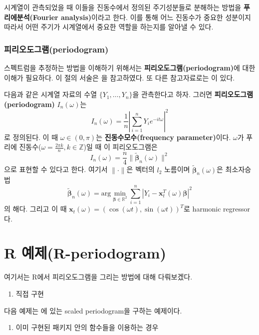 \documentclass[b5paper,]{scrbook}
\providecommand{\tightlist}{%
  \setlength{\itemsep}{0pt}\setlength{\parskip}{0pt}}
\theoremstyle{plain}
\theoremstyle{definition}
\numberwithin{equation}{section}
\begin{document}
시계열이 관측되었을 때 이들을 진동수에서 정의된 주기성분들로 분해하는 방법을 \textbf{푸리에분석(Fourier analysis)}이라고 한다. 이를 통해 어느 진동수가 중요한 성분이지 따라서 어떤 주기가 시계열에서 중요한 역할을 하는지를 알아낼 수 있다.

\hypertarget{periodogram}{%
\subsubsection{피리오도그램(periodogram)}\label{periodogram}}

스펙트럼을 추정하는 방법을 이해하기 위해서는 \textbf{피리오도그램(periodogram)}에 대한 이해가 필요하다. 이 절의 서술은 \citep{Lim2013}을 참고하였다. 또 다른 참고자료로는 \citep{Shumway2010}이 있다.

다음과 같은 시계열 자료의 수열 \(\{Y_{1}, \ldots, Y_{n}\}\)을 관측한다고 하자. 그러면 \textbf{피리오도그램(periodogram)} \(I_{n}(\omega)\)는
\[I_{n}(\omega)=\frac{1}{n}| \sum_{i=1}^{n}Y_{i}e^{-it\omega}|^{2}\]
로 정의된다. 이 때 \(\omega\in (0,\pi)\)는 \textbf{진동수모수(frequency parameter)}이다. \(\omega\)가 푸리에 진동수(\(\omega=\frac{2\pi k}{n}, k\in\mathbb{Z}\))일 때 이 피리오도그램은
\[I_{n}(\omega)=\frac{n}{4}\| \tilde{\boldsymbol{\beta}}_{n}(\omega)\|^{2}\]
으로 표현할 수 있다고 한다\citep{Li2008}. 여기서 \(\| \cdot \|\)은 벡터의 \(l_{2}\) 노름이며 \(\tilde{\boldsymbol{\beta}}_{n}(\omega)\)은 최소자승법
\[\tilde{\boldsymbol{\beta}}_{n}(\omega)=\text{arg}\min_{\boldsymbol{\beta}\in\mathbb{R}^{2}}\sum_{i=1}^{n}| Y_{i}-\mathbf{x}_{t}^{T}(\omega)\boldsymbol{\beta}|^{2}\]
의 해다. 그리고 이 때 \(\mathbf{x}_{t}(\omega)=(\cos(\omega t), \sin (\omega t))^{T}\)로 harmonic regressor다.

\hypertarget{r-r-periodogram}{%
\section{R 예제(R-periodogram)}\label{r-r-periodogram}}

여기서는 R에서 피리오도그램을 그리는 방법에 대해 다뤄보겠다.

\begin{enumerate}
\def\labelenumi{\arabic{enumi}.}
\tightlist
\item
  직접 구현
\end{enumerate}

다음 예제는 \citep{Shumway2010}에 있는 scaled periodogram을 구하는 예제이다.

\begin{enumerate}
\def\labelenumi{\arabic{enumi}.}
\setcounter{enumi}{1}
\tightlist
\item
  이미 구현된 패키지 안의 함수들을 이용하는 경우
\end{enumerate}
\end{document}
